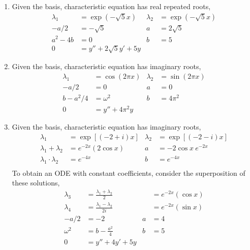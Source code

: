 \begin{enumerate}
    \item Given the basis, characteristic equation has real repeated roots,
          \begin{align}
              \lambda_{1} & = \exp(-\sqrt{5}x)       & \lambda_{2} & = \exp(-\sqrt{5}x) \\
              -a/2        & = -\sqrt{5}              & a           & = 2\sqrt{5}        \\
              a^{2} - 4b  & = 0                      & b           & =   5              \\
              0           & = y'' + 2\sqrt{5}y' + 5y
          \end{align}

    \item Given the basis, characteristic equation has imaginary roots,
          \begin{align}
              \lambda_{1} & = \cos(2\pi x)     & \lambda_{2} & = \sin(2\pi x) \\
              -a/2        & = 0                & a           & = 0            \\
              b - a^{2}/4 & = \omega ^{2}      & b           & =   4\pi ^{2}  \\
              0           & = y'' + 4\pi ^{2}y
          \end{align}

    \item Given the basis, characteristic equation has imaginary roots,
          \begin{align}
              \lambda_{1}                   & = \exp[(-2+i)x]    & \lambda_{2} & = \exp[(-2-i)x]     \\
              \lambda_{1} + \lambda_{2}     & = e^{-2x}(2\cos x) & a           & = -2\cos x\ e^{-2x} \\
              \lambda_{1} \cdot \lambda_{2} & = e^{-4x}          & b           & =   e^{-4x}         \\
          \end{align}
          To obtain an ODE with constant coefficients, consider the superposition of these solutions,
          \begin{align}
              \lambda_{3} & = \frac{\lambda_{1} + \lambda_{2}}{2}  &   & = e^{-2x}(\cos x) \\
              \lambda_{4} & = \frac{\lambda_{1} - \lambda_{2}}{2i} &   & = e^{-2x}(\sin x) \\
              -a/2        & = -2                                   & a & = 4               \\
              \omega ^{2} & = b - \frac{a^{2}}{4}                  & b & = 5               \\
              0           & = y'' + 4y' + 5y
          \end{align}


\end{enumerate}

